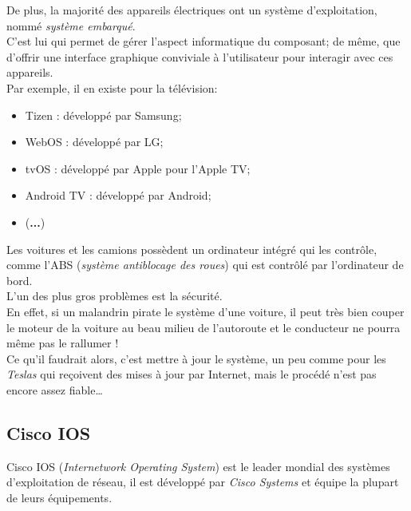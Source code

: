 \newpage

De plus, la majorité des appareils électriques ont un système d'exploitation,
nommé \textit{système embarqué}. \\
C'est lui qui permet de gérer l'aspect informatique du composant; de même, que
d'offrir une interface graphique conviviale à l'utilisateur pour interagir avec
ces appareils. \\

Par exemple, il en existe pour la télévision: \\

\begin{itemize}
\item Tizen : développé par Samsung; \\

\item WebOS : développé par LG; \\

\item tvOS : développé par Apple pour l'Apple TV; \\

\item Android TV : développé par Android; \\

\item (\textbf{...}) \\
\end{itemize}

Les voitures et les camions possèdent un ordinateur intégré qui les contrôle,
comme l'ABS (\textit{système antiblocage des roues}) qui est contrôlé par
l'ordinateur de bord. \\
L'un des plus gros problèmes est la sécurité. \\En effet, si un malandrin pirate
le système d'une voiture, il peut très bien couper le moteur de la voiture au
beau milieu de l'autoroute et le conducteur ne pourra même pas le rallumer ! \\
Ce qu'il faudrait alors, c'est mettre à jour le système, un peu comme pour les
\textit{Teslas} qui reçoivent des mises à jour par Internet, mais le procédé
n'est pas encore assez fiable…

\clearpage

\subsection{Cisco IOS}
Cisco IOS (\textit{Internetwork Operating System}) est le leader mondial des
systèmes d'exploitation de réseau, il est développé par \textit{Cisco Systems}
et équipe la plupart de leurs équipements.

